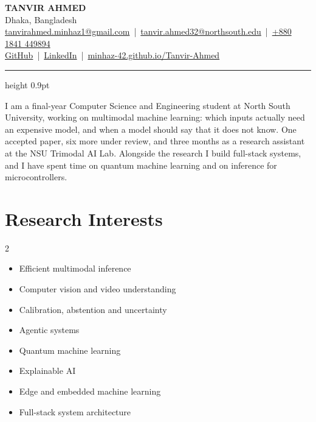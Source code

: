 \documentclass[10pt,letterpaper]{article}
\let\origsection\section
\renewcommand{\section}[1]{\needspace{7\baselineskip}\origsection{#1}}
\begin{document}
\begin{center}
  {\Huge\bfseries TANVIR AHMED}\\[7pt]
  Dhaka, Bangladesh\\[3pt]
  \href{mailto:tanvirahmed.minhaz1@gmail.com}{tanvirahmed.minhaz1@gmail.com} \,|\,
  \href{mailto:tanvir.ahmed32@northsouth.edu}{tanvir.ahmed32@northsouth.edu} \,|\,
  \href{tel:+8801841449894}{+880 1841 449894}\\[2pt]
  \href{https://github.com/minhaz-42}{GitHub} \,|\,
  \href{https://www.linkedin.com/in/tanvir-ahmed-ml/}{LinkedIn} \,|\,
  \href{https://minhaz-42.github.io/Tanvir-Ahmed/}{minhaz-42.github.io/Tanvir-Ahmed}
\end{center}
\vspace{-4pt}
{\hrule height 0.9pt}

\vspace{6pt}
\noindent
I am a final-year Computer Science and Engineering student at North South University, working on
multimodal machine learning: which inputs actually need an expensive model, and when a model should
say that it does not know. One accepted paper, six more under review, and three months as a
research assistant at the NSU Trimodal AI Lab. Alongside the research I build full-stack systems,
and I have spent time on quantum machine learning and on inference for microcontrollers.

\section{Research Interests}
\begin{multicols}{2}
\begin{itemize}[topsep=0pt]
  \item Efficient multimodal inference
  \item Computer vision and video understanding
  \item Calibration, abstention and uncertainty
  \item Agentic systems
  \item Quantum machine learning
  \item Explainable AI
  \item Edge and embedded machine learning
  \item Full-stack system architecture
\end{itemize}
\end{multicols}
\end{document}
